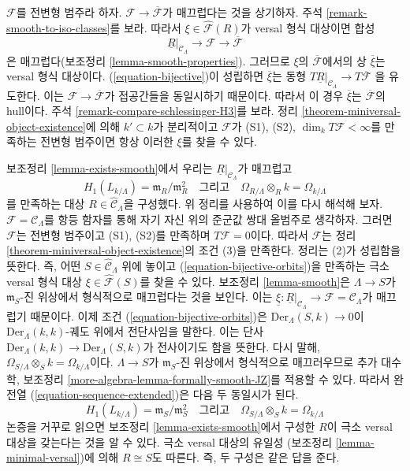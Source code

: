 \begin{remark}
\label{remark-compose-minimal-into-iso-classes}
$\mathcal{F}$를 전변형 범주라 하자.
$\mathcal{F} \to \overline{\mathcal{F}}$가 매끄럽다는 것을 상기하자.
주석 \ref{remark-smooth-to-iso-classes}를 보라.
따라서 $\xi \in \widehat{\mathcal{F}}(R)$가 versal 형식 대상이면
합성
$$
\underline{R}|_{\mathcal{C}_\Lambda} \longrightarrow
\mathcal{F} \longrightarrow \overline{\mathcal{F}}
$$
은 매끄럽다(보조정리 \ref{lemma-smooth-properties}).
그러므로 $\xi$의 $\overline{\mathcal{F}}$에서의 상
$\overline{\xi}$는 versal 형식 대상이다.
(\ref{equation-bijective})이 성립하면 $\overline{\xi}$는
동형
$T\underline{R}|_{\mathcal{C}_\Lambda} \to T\overline{\mathcal{F}}$
을 유도한다. 이는 $\mathcal{F} \to \overline{\mathcal{F}}$가
접공간들을 동일시하기 때문이다.
따라서 이 경우 $\overline{\xi}$는
$\overline{\mathcal{F}}$의 hull이다.
주석 \ref{remark-compare-schlessinger-H3}를 보라.
정리 \ref{theorem-miniversal-object-existence}에 의해
$k' \subset k$가 분리적이고 $\mathcal{F}$가
(S1), (S2), $\dim_k T\mathcal{F} < \infty$를 만족하는 전변형 범주이면
항상 이러한 $\xi$를 찾을 수 있다.
\end{remark}

\begin{example}
\label{example-smooth-continued}
보조정리 \ref{lemma-exists-smooth}에서 우리는
$\underline{R}|_{\mathcal{C}_\Lambda}$가 매끄럽고
$$
H_1(L_{k/\Lambda}) = \mathfrak m_R/\mathfrak m_R^2
\quad\text{그리고}\quad
\Omega_{R/\Lambda} \otimes_R k = \Omega_{k/\Lambda}
$$
를 만족하는 대상 $R \in \widehat{\mathcal{C}}_\Lambda$을 구성했다.
위 정리를 사용하여 이를 다시 해석해 보자.
$\mathcal{F} = \mathcal{C}_\Lambda$를 항등 함자를 통해
자기 자신 위의 준군값 쌍대 올범주로 생각하자.
그러면 $\mathcal{F}$는 전변형 범주이고 (S1), (S2)를 만족하며
$T\mathcal{F} = 0$이다.
따라서 $\mathcal{F}$는 정리
\ref{theorem-miniversal-object-existence}의 조건 (3)을 만족한다.
정리는 (2)가 성립함을 뜻한다. 즉, 어떤
$S \in \widehat{\mathcal{C}}_\Lambda$ 위에 놓이고
(\ref{equation-bijective-orbits})을 만족하는 극소 versal 형식 대상
$\xi \in \widehat{\mathcal{F}}(S)$를 찾을 수 있다.
보조정리 \ref{lemma-smooth}은 $\Lambda \to S$가
$\mathfrak m_S$-진 위상에서 형식적으로 매끄럽다는 것을 보인다.
이는
$\underline{\xi} : \underline{R}|_{\mathcal{C}_\Lambda} \to
\mathcal{F} = \mathcal{C}_\Lambda$가 매끄럽기 때문이다.
이제 조건 (\ref{equation-bijective-orbits})은
$\text{Der}_\Lambda(S, k) \to 0$이
$\text{Der}_\Lambda(k, k)$-궤도 위에서 전단사임을 말한다.
이는 단사
$\text{Der}_\Lambda(k, k) \to \text{Der}_\Lambda(S, k)$가
전사이기도 함을 뜻한다. 다시 말해,
$\Omega_{S/\Lambda} \otimes_S k = \Omega_{k/\Lambda}$이다.
$\Lambda \to S$가 $\mathfrak m_S$-진 위상에서
형식적으로 매끄러우므로 추가 대수학, 보조정리
\ref{more-algebra-lemma-formally-smooth-JZ}를 적용할 수 있다.
따라서 완전열 (\ref{equation-sequence-extended})은
다음 두 동일시가 된다.
$$
H_1(L_{k/\Lambda}) = \mathfrak m_S/\mathfrak m_S^2
\quad\text{그리고}\quad
\Omega_{S/\Lambda} \otimes_S k = \Omega_{k/\Lambda}
$$
논증을 거꾸로 읽으면 보조정리 \ref{lemma-exists-smooth}에서
구성한 $R$이 극소 versal 대상을 갖는다는 것을 알 수 있다.
극소 versal 대상의 유일성
(보조정리 \ref{lemma-minimal-versal})에 의해
$R \cong S$도 따른다. 즉, 두 구성은 같은 답을 준다.
\end{example}

